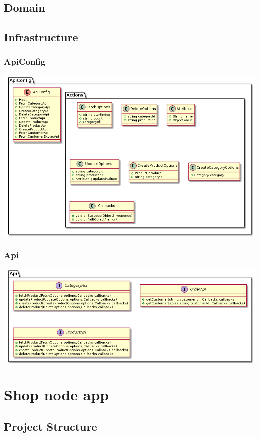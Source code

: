\documentclass{article}
\begin{document}
\subsection{Domain}
\subsection{Infrastructure}
\subsubsection{ApiConfig}
\includegraphics[scale=0.5]{./out/ReactApp/Infrastructure/ApiConfig/ApiConfig.png}
\subsubsection{Api}
\includegraphics[scale=0.5]{./out/ReactApp/Infrastructure/Api/Api.png}
\section{Shop node app}
\subsection{Project Structure}
\end{document}
